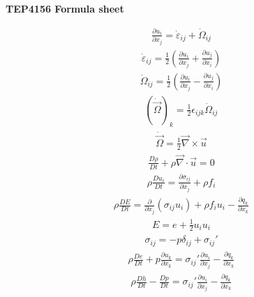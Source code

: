 \documentclass[10pt, a4paper]{article}
\begin{document}
\begin{center}
    \Large
    \textbf{TEP4156 Formula sheet}
    \vspace{0.5cm}
\end{center}

\begin{multicols}{2}
\begin{gather*}
    \frac{\partial u_i}{\partial x_j} = \dot{\varepsilon}_{ij} + \dot{\Omega}_{ij}
\end{gather*}
\begin{gather*}
    \dot{\varepsilon}_{ij} = \frac12\left( \frac{\partial u_i}{\partial x_j} +
    \frac{\partial u_j}{\partial x_i}\right)
\end{gather*}
\begin{gather*}
    \dot{\Omega}_{ij} = \frac12\left( \frac{\partial u_i}{\partial x_j} -
    \frac{\partial u_j}{\partial x_i}\right)
\end{gather*}
\begin{gather*}
    (\dot{\vec{\Omega}})_k = \frac12 \epsilon_{ijk}\dot{\Omega}_{ij}
\end{gather*}
\begin{gather*}
    \dot{\vec{\Omega}} = \frac12 \vec{\nabla}\times\vec{u}
\end{gather*}
\begin{gather*}
    \frac{D\rho}{Dt} + \rho \vec{\nabla} \cdot \vec{u} = 0
\end{gather*}
\begin{gather*}
    \rho \frac{Du_i}{Dt} = \frac{\partial \sigma_{ij}}{\partial x_j} + \rho f_i
\end{gather*}
\begin{gather*}
    \rho \frac{DE}{Dt} = \frac{\partial}{\partial x_j}(\sigma_{ij} u_i) + \rho f_i u_i - \frac{\partial q_k}{\partial x_k}
\end{gather*}
\begin{gather*}
    E = e + \frac12 u_i u_i
\end{gather*}
\begin{gather*}
    \sigma_{ij} = -p \delta_{ij} + \sigma_{ij}'
\end{gather*}
\begin{gather*}
    \rho \frac{De}{Dt} + p\frac{\partial u_k}{\partial x_k} =
    \sigma_{ij}' \frac{\partial u_i}{\partial x_j}  - \frac{\partial q_k}{\partial x_k}
\end{gather*}
\begin{gather*}
    \rho \frac{Dh}{Dt} - \frac{Dp}{Dt} =
    \sigma_{ij}' \frac{\partial u_i}{\partial x_j}  - \frac{\partial q_k}{\partial x_k}

\end{gather*}
\end{multicols}
\end{document}
